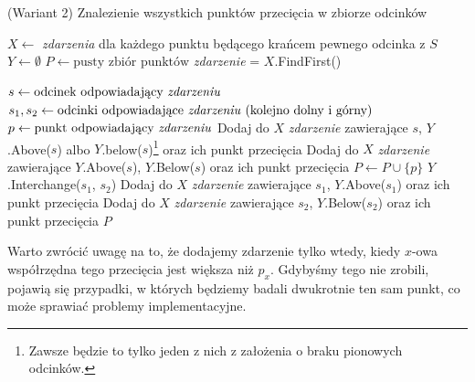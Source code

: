 \begin{algorithm}[H]
	\caption{(Wariant 2) Znalezienie wszystkich punktów przecięcia w zbiorze odcinków}
	\begin{algorithmic}[1]
		\State  $X \gets$ \textit{zdarzenia} dla każdego punktu będącego
		krańcem pewnego odcinka z $S$
		\State $Y \gets \emptyset$
		\State $P \gets \text{pusty zbiór punktów}$ 
		\State \textit{zdarzenie} = $X.$FindFirst()
		
			\State $s \gets \text{odcinek odpowiadający \textit{zdarzeniu}}$
			\State $s_1, s_2 \gets \text{odcinki odpowiadające \textit{zdarzeniu} (kolejno dolny i górny)}$
		\EndIf
		\State $p \gets \text{punkt odpowiadający \textit{zdarzeniu}}$
		\State
		\State Dodaj do $X$ \textit{zdarzenie} zawierające $s$, $Y$.Above($s$)
		albo $Y$.below($s$)\footnote{Zawsze będzie to tylko jeden z nich z założenia o braku pionowych odcinków.} oraz ich punkt przecięcia
		\EndIf
		\State Dodaj do $X$ \textit{zdarzenie} zawierające $Y$.Above($s$), $Y$.Below($s$) oraz ich punkt przecięcia  
		\EndIf
		\Else
		\State $P \gets P \cup \{p\}$
		\State $Y$.Interchange($s_1$, $s_2$)
		\State Dodaj do $X$ \textit{zdarzenie} zawierające $s_1$, $Y$.Above($s_1$) oraz ich punkt przecięcia
		\EndIf
		\State Dodaj do $X$ \textit{zdarzenie} zawierające $s_2$, $Y$.Below($s_2$) oraz ich punkt przecięcia
		\EndIf
		\EndIf
		\EndWhile
		\State \Return $P$
		\EndProcedure
	\end{algorithmic}
	\label{HasIntersectingSegments2}
\end{algorithm}

Warto zwrócić uwagę na to, że dodajemy zdarzenie tylko wtedy, kiedy
$x$-owa współrzędna tego przecięcia jest większa niż $p_x$. Gdybyśmy tego nie zrobili,
pojawią się przypadki, w których będziemy badali dwukrotnie ten sam punkt, co 
może sprawiać problemy implementacyjne.

